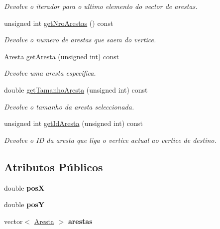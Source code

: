 \begin{DoxyCompactItemize}
\begin{DoxyCompactList}\small\item\em Devolve o iterador para o ultimo elemento do vector de arestas. \end{DoxyCompactList}\item 
unsigned int \hyperlink{class_vertice_a3582db768077cd58cc2f79ed140439ff}{get\-Nro\-Arestas} () const 
\begin{DoxyCompactList}\small\item\em Devolve o numero de arestas que saem do vertice. \end{DoxyCompactList}\item 
\hyperlink{class_aresta}{Aresta} \hyperlink{class_vertice_a9ce9712d4b23b8accb4b723ae8239b5f}{get\-Aresta} (unsigned int) const 
\begin{DoxyCompactList}\small\item\em Devolve uma aresta especifica. \end{DoxyCompactList}\item 
double \hyperlink{class_vertice_aa77e652d3fe5ab79e5eb45937d4494b3}{get\-Tamanho\-Aresta} (unsigned int) const 
\begin{DoxyCompactList}\small\item\em Devolve o tamanho da aresta seleccionada. \end{DoxyCompactList}\item 
unsigned int \hyperlink{class_vertice_ad4ff073be2f07c4046da26cfab132805}{get\-Id\-Aresta} (unsigned int) const 
\begin{DoxyCompactList}\small\item\em Devolve o I\-D da aresta que liga o vertice actual ao vertice de destino. \end{DoxyCompactList}\end{DoxyCompactItemize}
\subsection*{Atributos Públicos}
\begin{DoxyCompactItemize}
\item 
\hypertarget{class_vertice_a620e1196abf64949bc73f1445de46f10}{double {\bfseries pos\-X}}\label{class_vertice_a620e1196abf64949bc73f1445de46f10}

\item 
\hypertarget{class_vertice_a7b470bff99aa4f6cb17ef876d2c93c1a}{double {\bfseries pos\-Y}}\label{class_vertice_a7b470bff99aa4f6cb17ef876d2c93c1a}

\item 
\hypertarget{class_vertice_a830de82c31e960d5c212853fb94078cb}{vector$<$ \hyperlink{class_aresta}{Aresta} $>$ {\bfseries arestas}}\label{class_vertice_a830de82c31e960d5c212853fb94078cb}

\end{DoxyCompactItemize}

